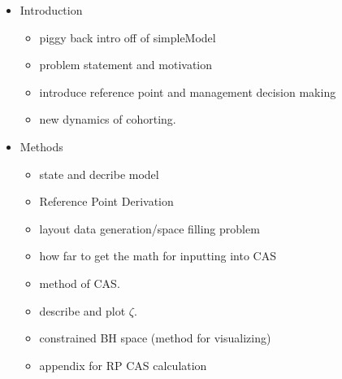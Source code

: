 \begin{itemize}
\item Introduction
	\begin{itemize}
	\item piggy back intro off of simpleModel
	\item problem statement and motivation
	\item introduce reference point and management decision making 
	\item new dynamics of cohorting.
	\end{itemize}
\item Methods
	\begin{itemize}		
		\item state and decribe model
		\item Reference Point Derivation
		\item layout data generation/space filling problem 
		\item how far to get the math for inputting into CAS
		\item method of CAS.
		\item describe and plot $\zeta$.%
		\item constrained BH space (method for visualizing)
		\item appendix for RP CAS calculation

\end{itemize}
\end{itemize}
